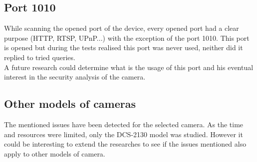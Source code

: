 \subsection{Port 1010}

While scanning the opened port of the device, every opened port had a clear purpose (HTTP, RTSP, UPnP...) with the exception of the port 1010.
This port is opened but during the tests realised this port was never used, neither did it replied to tried queries.\\

A future research could determine what is the usage of this port and his eventual interest in the security analysis of the camera.

\subsection{Other models of cameras}

The mentioned issues have been detected for the selected camera.
As the time and resources were limited, only the DCS-2130 model was studied.
However it could be interesting to extend the researches to see if the issues mentioned also apply to other models of camera.
